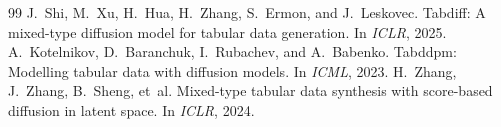 \documentclass[11pt,a4paper]{article}
\begin{document}

\begin{thebibliography}{99}
J.~Shi, M.~Xu, H.~Hua, H.~Zhang, S.~Ermon, and J.~Leskovec.
\newblock Tabdiff: A mixed-type diffusion model for tabular data generation.
\newblock In \emph{ICLR}, 2025.
A.~Kotelnikov, D.~Baranchuk, I.~Rubachev, and A.~Babenko.
\newblock Tabddpm: Modelling tabular data with diffusion models.
\newblock In \emph{ICML}, 2023.
H.~Zhang, J.~Zhang, B.~Sheng, et~al.
\newblock Mixed-type tabular data synthesis with score-based diffusion in latent space.
\newblock In \emph{ICLR}, 2024.
\end{thebibliography}
\end{document}
